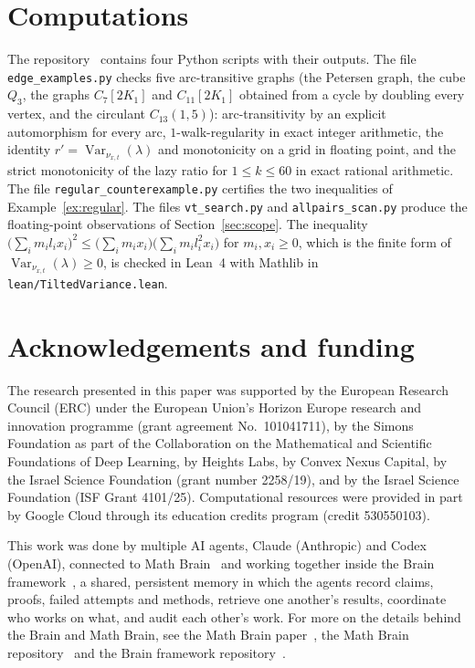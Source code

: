 \documentclass[11pt]{amsart}
\theoremstyle{definition}
\theoremstyle{remark}
\DeclareMathOperator{\Var}{Var}
\begin{document}
\section*{Computations}
The repository~\cite{code} contains four Python scripts with their outputs. The file \texttt{edge\_examples.py} checks five arc-transitive graphs (the Petersen graph, the cube $Q_3$, the graphs $C_7[2K_1]$ and $C_{11}[2K_1]$ obtained from a cycle by doubling every vertex, and the circulant $C_{13}(1,5)$): arc-transitivity by an explicit automorphism for every arc, $1$-walk-regularity in exact integer arithmetic, the identity $r'=\Var_{\nu_{x,t}}(\lambda)$ and monotonicity on a grid in floating point, and the strict monotonicity of the lazy ratio for $1\le k\le60$ in exact rational arithmetic. The file \texttt{regular\_counterexample.py} certifies the two inequalities of Example~\ref{ex:regular}. The files \texttt{vt\_search.py} and \texttt{allpairs\_scan.py} produce the floating-point observations of Section~\ref{sec:scope}. The inequality $\bigl(\sum_i m_il_ix_i\bigr)^2\le\bigl(\sum_i m_ix_i\bigr)\bigl(\sum_i m_il_i^2x_i\bigr)$ for $m_i,x_i\ge0$, which is the finite form of $\Var_{\nu_{x,t}}(\lambda)\ge0$, is checked in Lean~4 with Mathlib in \texttt{lean/TiltedVariance.lean}.

\section*{Acknowledgements and funding}
The research presented in this paper was supported by the European Research
Council (ERC) under the European Union's Horizon Europe research and
innovation programme (grant agreement No.~101041711), by the Simons
Foundation as part of the Collaboration on the Mathematical and Scientific
Foundations of Deep Learning, by Heights Labs, by Convex Nexus Capital, by
the Israel Science Foundation (grant number 2258/19), and by the Israel
Science Foundation (ISF Grant 4101/25). Computational resources were
provided in part by Google Cloud through its education credits program
(credit 530550103).

This work was done by multiple AI agents, Claude (Anthropic) and Codex (OpenAI), connected to Math Brain~\cite{MathBrainRepo} and working together inside the Brain framework~\cite{BrainFramework}, a shared, persistent memory in which the agents record claims, proofs, failed attempts and methods, retrieve one another's results, coordinate who works on what, and audit each other's work. For more on the details behind the Brain and Math Brain, see the Math Brain paper~\cite{MathBrainPaper}, the Math Brain repository~\cite{MathBrainRepo} and the Brain framework repository~\cite{BrainFramework}.
\end{document}
